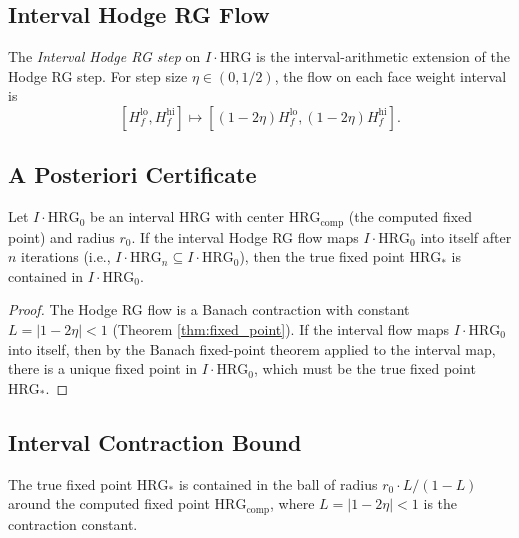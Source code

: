 \subsection{Interval Hodge RG Flow}
\label{ssec:ivflow}

\begin{definition}
\label{def:iv_step}
The \emph{Interval Hodge RG step} on $I\!\cdot\!\mathrm{HRG}$ is the
interval-arithmetic extension of the Hodge RG step. For step size
$\eta\in(0,1/2)$, the flow on each face weight interval is
\[
[H_{f}^{\mathrm{lo}},H_{f}^{\mathrm{hi}}]\mapsto
[(1-2\eta)H_{f}^{\mathrm{lo}},(1-2\eta)H_{f}^{\mathrm{hi}}].
\]
\end{definition}

\subsection{A Posteriori Certificate}
\label{ssec:apc}

\begin{theorem}
\label{thm:apc}
Let $I\!\cdot\!\mathrm{HRG}_{0}$ be an interval HRG with center
$\mathrm{HRG}_{\mathrm{comp}}$ (the computed fixed point) and radius
$r_{0}$. If the interval Hodge RG flow maps
$I\!\cdot\!\mathrm{HRG}_{0}$ into itself after $n$ iterations (i.e.,
$I\!\cdot\!\mathrm{HRG}_{n}\subseteq I\!\cdot\!\mathrm{HRG}_{0}$),
then the true fixed point $\mathrm{HRG}_{*}$ is contained in
$I\!\cdot\!\mathrm{HRG}_{0}$.
\end{theorem}

\begin{proof}
The Hodge RG flow is a Banach contraction with constant
$L=|1-2\eta|<1$ (Theorem \ref{thm:fixed_point}). If the interval flow
maps $I\!\cdot\!\mathrm{HRG}_{0}$ into itself, then by the Banach
fixed-point theorem applied to the interval map, there is a unique
fixed point in $I\!\cdot\!\mathrm{HRG}_{0}$, which must be the true
fixed point $\mathrm{HRG}_{*}$.
\end{proof}

\subsection{Interval Contraction Bound}
\label{ssec:icb}

\begin{theorem}
\label{thm:icb}
The true fixed point $\mathrm{HRG}_{*}$ is contained in the ball of
radius $r_{0}\cdot L/(1-L)$ around the computed fixed point
$\mathrm{HRG}_{\mathrm{comp}}$, where $L=|1-2\eta|<1$ is the
contraction constant.
\end{theorem}

